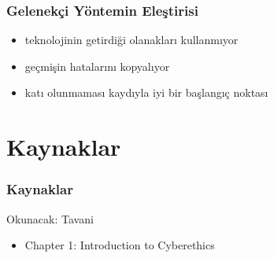 \documentclass[dvipsnames]{beamer}
\theoremstyle{definition}
\theoremstyle{example}
\theoremstyle{plain}
\begin{document}
\begin{frame}
  \frametitle{Gelenekçi Yöntemin Eleştirisi}

  \begin{itemize}
    \item teknolojinin getirdiği olanakları kullanmıyor
    \item geçmişin hatalarını kopyalıyor

    \bigskip
    \item katı olunmaması kaydıyla iyi bir başlangıç noktası
  \end{itemize}
\end{frame}

\section*{Kaynaklar}

\begin{frame}
  \frametitle{Kaynaklar}

  \begin{block}{Okunacak: Tavani}
    \begin{itemize}
      \item Chapter 1: \alert{Introduction to Cyberethics}
    \end{itemize}
  \end{block}
\end{frame}
\end{document}
